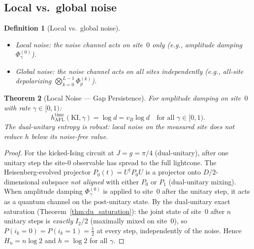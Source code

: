 \documentclass[12pt,a4paper]{article}
\newtheorem{theorem}{Theorem}[section]
\newtheorem{definition}[theorem]{Definition}
\begin{document}
\subsection{Local vs.\ global noise}

\begin{definition}[Local vs.\ global noise]
\begin{itemize}
\item \emph{Local noise}: the noise channel acts on site~$0$ only (e.g.,
  amplitude damping $\Phi_{\gamma}^{(0)}$).
\item \emph{Global noise}: the noise channel acts on \emph{all} sites
  independently (e.g., all-site depolarizing $\bigotimes_{k=0}^{L-1}\Phi_p^{(k)}$).
\end{itemize}
\end{definition}

\begin{theorem}[Local Noise --- Gap Persistence]
\label{thm:local_gap}
For amplitude damping on site~$0$ with rate $\gamma\in[0,1)$:
\[
  h_{\mathrm{AFL}}^{\mathrm{time}}(\mathrm{KI},\gamma)
  = \log d = v_B\log d
  \quad\text{for all }\gamma\in[0,1).
\]
The dual-unitary entropy is \emph{robust}: local noise on the
measured site does not reduce $h$ below its noise-free value.
\end{theorem}
\begin{proof}
For the kicked-Ising circuit at $J=g=\pi/4$ (dual-unitary), after one
unitary step the site-$0$ observable has spread to the full lightcone.
The Heisenberg-evolved projector $P_0(t)=U^{\dagger}P_0 U$ is a projector
onto $D/2$-dimensional subspace \emph{not aligned} with either $P_0$ or $P_1$
(dual-unitary mixing).  When amplitude damping $\Phi_{\gamma}^{(0)}$ is
applied to site~$0$ after the unitary step, it acts as a quantum channel
on the post-unitary state.  By the dual-unitary exact saturation
(Theorem~\ref{thm:du_saturation}): the joint state of site~$0$ after $n$
unitary steps is \emph{exactly} $I_2/2$ (maximally mixed on site~$0$),
so $P(i_k = 0) = P(i_k = 1) = \tfrac12$ at every step, independently of
the noise.  Hence $H_n = n\log 2$ and $h=\log 2$ for all $\gamma$.
\end{proof}
\end{document}
